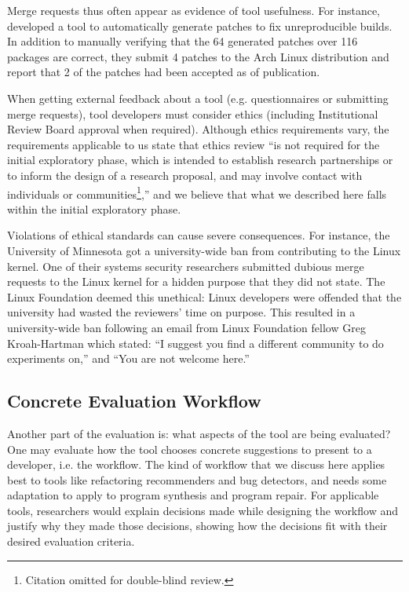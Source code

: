 Merge requests thus often appear as evidence of tool usefulness.
For instance,  developed a tool
to automatically generate patches to fix unreproducible builds.
In addition to manually verifying that the 64 generated patches over 116 packages
are correct, they submit 4 patches to the Arch Linux distribution and report
that 2 of the patches had been accepted as of publication.

When getting external feedback about a tool (e.g. questionnaires or
submitting merge requests), tool developers must consider ethics
(including Institutional Review Board approval when required). Although
ethics requirements vary, the requirements
applicable to us state that ethics review 
``is not required for the initial exploratory phase, which is intended to establish research partnerships or to inform the design of a research proposal, and may involve contact with individuals or communities\footnote{Citation omitted for double-blind review.},'' and we believe that what we
described here falls within the initial exploratory phase.

Violations of ethical
standards can cause severe consequences. For instance, the
University of Minnesota got a university-wide ban from contributing to
the Linux kernel. One of their systems security researchers submitted
dubious merge requests to the Linux kernel for a hidden purpose that they did
not state. The Linux Foundation deemed this
unethical: Linux developers were offended that the university had 
wasted the reviewers' time on purpose. This resulted in a university-wide ban
following an email from Linux Foundation fellow Greg Kroah-Hartman
which stated: ``I suggest you find a different community to do
experiments on,'' and ``You are not welcome
here.''~\cite{minnesota_banned}

\subsection{Concrete Evaluation Workflow}
Another part of the evaluation is: what aspects of the tool are
being evaluated?
One may evaluate how the tool chooses concrete
suggestions to present to a developer, i.e. the workflow. 
The kind of workflow that we discuss here applies
best to tools like refactoring recommenders and bug detectors, and
needs some adaptation to apply to program synthesis and program repair.
For applicable tools, researchers would explain decisions made while
designing the workflow and justify why they made those decisions, showing how the
decisions fit
with their desired evaluation criteria.

